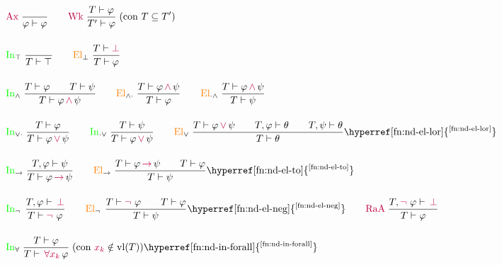 \[
\renewcommand{\arraystretch}{1.8}
\begin{array}{l}
\purple{\mathrm{Ax}}\;\displaystyle\frac{\vphantom{T}}{\varphi \vdash \varphi}
\qquad
\purple{\mathrm{Wk}}\;\displaystyle\frac{T \vdash \varphi}{T' \vdash \varphi}\;\text{(con }T \subseteq T'\text{)}
\\[4ex]
\textcolor{green}{\mathrm{In}}_{\top}\;\displaystyle\frac{\vphantom{T}}{T \vdash \top}
\qquad
\textcolor{orange}{\mathrm{El}}_{\bot}\;\displaystyle\frac{T \vdash \purple{\bot}}{T \vdash \varphi}
\\[4ex]
\textcolor{green}{\mathrm{In}}_{\land}\;\displaystyle\frac{T \vdash \varphi \qquad T \vdash \psi}{T \vdash \varphi \,\purple{\land} \, \psi}
\qquad
\textcolor{orange}{\mathrm{El}}_{\land\cdot}\;\displaystyle\frac{T \vdash \varphi \,\purple{\land} \, \psi}{T \vdash \varphi}
\qquad
\textcolor{orange}{\mathrm{El}}_{\cdot\land}\;\displaystyle\frac{T \vdash \varphi \,\purple{\land} \, \psi}{T \vdash \psi}
\\[4ex]
\textcolor{green}{\mathrm{In}}_{\lor\cdot}\;\displaystyle\frac{T \vdash \varphi}{T \vdash \varphi \,\purple{\lor} \, \psi}
\qquad
\textcolor{green}{\mathrm{In}}_{\cdot\lor}\;\displaystyle\frac{T \vdash \psi}{T \vdash \varphi \,\purple{\lor} \, \psi}
\qquad
\textcolor{orange}{\mathrm{El}}_{\lor}\;\displaystyle\frac{T \vdash \varphi \,\purple{\lor} \, \psi \qquad T, \varphi \vdash \theta \qquad T, \psi \vdash \theta}{T \vdash \theta}\text{\hyperref[fn:nd-el-lor]{\textsuperscript{\ref*{fn:nd-el-lor}}}}
\\[4ex]
\textcolor{green}{\mathrm{In}}_{\to}\;\displaystyle\frac{T, \varphi \vdash \psi}{T \vdash \varphi \,\purple{\to} \, \psi}
\qquad
\textcolor{orange}{\mathrm{El}}_{\to}\;\displaystyle\frac{T \vdash \varphi \,\purple{\to} \, \psi \qquad T \vdash \varphi}{T \vdash \psi}\text{\hyperref[fn:nd-el-to]{\textsuperscript{\ref*{fn:nd-el-to}}}}
\\[4ex]
\textcolor{green}{\mathrm{In}}_{\neg \,}\;\displaystyle\frac{T, \varphi \vdash \,\purple{\bot}}{T \vdash\purple{\neg \,}\, \varphi}
\qquad
\textcolor{orange}{\mathrm{El}}_{\neg \,}\;\displaystyle\frac{T \vdash \purple{\neg \,}\, \varphi \qquad T \vdash \varphi}{T \vdash \psi}\text{\hyperref[fn:nd-el-neg]{\textsuperscript{\ref*{fn:nd-el-neg}}}}
\qquad
\purple{\mathrm{RaA}}\;\displaystyle\frac{T, \purple{\neg \,}\, \varphi \vdash \,\purple{\bot}}{T \vdash \varphi}
\\[4ex]
\textcolor{green}{\mathrm{In}}_{\forall}\;\displaystyle\frac{T \vdash \varphi}{T \vdash \, \purple{\forall x_k}\, \varphi}\;\text{(con }\purple{x_k} \notin \vl(T)\text{)}\text{\hyperref[fn:nd-in-forall]{\textsuperscript{\ref*{fn:nd-in-forall}}}}

\end{array}\]
